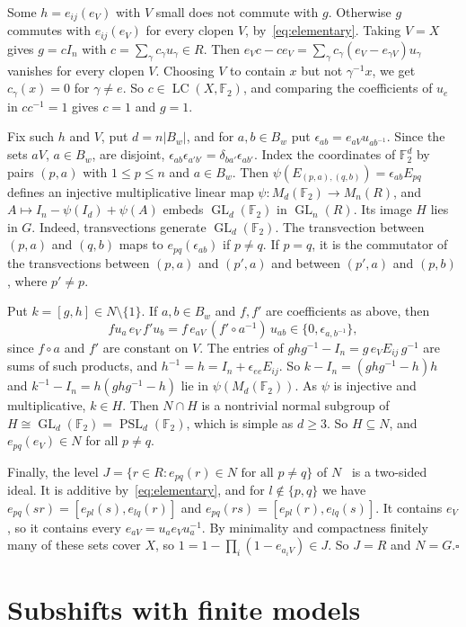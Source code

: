 \documentclass[11pt]{amsart}
\newcommand{\F}{\mathbb F}
\newcommand{\LC}{\operatorname{LC}}
\newcommand{\GL}{\operatorname{GL}}
\newcommand{\PSL}{\operatorname{PSL}}
\begin{document}
Some $h=e_{ij}(e_V)$ with $V$ small does not commute with $g$.
Otherwise $g$ commutes with $e_{ij}(e_V)$ for every clopen $V$,
by~\eqref{eq:elementary}. Taking $V=X$ gives $g=cI_n$ with
$c=\sum_\gamma c_\gamma u_\gamma\in R$. Then
$e_Vc-ce_V=\sum_\gamma c_\gamma(e_V-e_{\gamma V})u_\gamma$ vanishes for every
clopen $V$. Choosing $V$ to contain $x$ but not $\gamma^{-1}x$, we get
$c_\gamma(x)=0$ for $\gamma\ne e$. So $c\in\LC(X,\F_2)$, and comparing the
coefficients of $u_e$ in $cc^{-1}=1$ gives $c=1$ and $g=1$.

Fix such $h$ and $V$, put $d=n|B_w|$, and for $a,b\in B_w$ put
$\epsilon_{ab}=e_{aV}u_{ab^{-1}}$. Since the sets $aV$, $a\in B_w$, are
disjoint, $\epsilon_{ab}\epsilon_{a'b'}=\delta_{ba'}\epsilon_{ab'}$. Index the
coordinates of $\F_2^d$ by pairs $(p,a)$ with $1\le p\le n$ and
$a\in B_w$. Then $\psi(E_{(p,a),(q,b)})=\epsilon_{ab}E_{pq}$ defines an
injective multiplicative linear map $\psi:M_d(\F_2)\to M_n(R)$, and
$A\mapsto I_n-\psi(I_d)+\psi(A)$ embeds $\GL_d(\F_2)$ in $\GL_n(R)$. Its
image $H$ lies in $G$. Indeed, transvections generate $\GL_d(\F_2)$. The
transvection between $(p,a)$ and $(q,b)$ maps to $e_{pq}(\epsilon_{ab})$
if $p\ne q$. If $p=q$, it is the commutator of the transvections between
$(p,a)$ and $(p',a)$ and between $(p',a)$ and $(p,b)$, where $p'\ne p$.

Put $k=[g,h]\in N\setminus\{1\}$. If $a,b\in B_w$ and $f,f'$ are
coefficients as above, then
\[
  fu_a\,e_V\,f'u_b=f\,e_{aV}\,(f'\circ a^{-1})\,u_{ab}
  \in\{0,\epsilon_{a,b^{-1}}\},
\]
since $f\circ a$ and $f'$ are constant on $V$. The entries of
$ghg^{-1}-I_n=g\,e_VE_{ij}\,g^{-1}$ are sums of such products, and
$h^{-1}=h=I_n+\epsilon_{ee}E_{ij}$. So $k-I_n=(ghg^{-1}-h)h$ and
$k^{-1}-I_n=h(ghg^{-1}-h)$ lie in $\psi(M_d(\F_2))$. As $\psi$ is
injective and multiplicative, $k\in H$. Then $N\cap H$ is a nontrivial
normal subgroup of $H\cong\GL_d(\F_2)=\PSL_d(\F_2)$, which is simple as
$d\ge3$. So $H\subseteq N$, and $e_{pq}(e_V)\in N$ for all $p\ne q$.

Finally, the level $J=\{r\in R:e_{pq}(r)\in N\text{ for all }p\ne q\}$
of $N$~\cite{Stepanov} is a two-sided ideal. It is additive
by~\eqref{eq:elementary}, and for $l\notin\{p,q\}$ we have
$e_{pq}(sr)=[e_{pl}(s),e_{lq}(r)]$ and $e_{pq}(rs)=[e_{pl}(r),e_{lq}(s)]$.
It contains $e_V$, so it contains every $e_{aV}=u_ae_Vu_a^{-1}$. By
minimality and compactness finitely many of these sets cover $X$, so
$1=1-\prod_i(1-e_{a_iV})\in J$. So $J=R$ and $N=G$.\hfill$\square$

\section{Subshifts with finite models}
\end{document}
